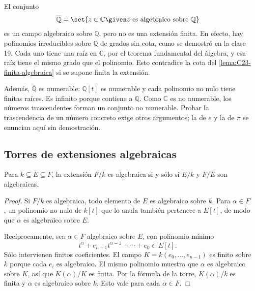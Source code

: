 \begin{ejem}
El conjunto
\[
\overline{\mathbb Q}=\set{z\in\mathbb C\given z\text{ es algebraico sobre }\mathbb Q}
\]
es un campo algebraico sobre $\mathbb Q$, pero no es una extensión finita. En efecto, hay polinomios irreducibles sobre $\mathbb Q$ de grados sin cota, como se demostró en la clase 19. Cada uno tiene una raíz en $\mathbb C$, por el teorema fundamental del álgebra, y esa raíz tiene el mismo grado que el polinomio. Esto contradice la cota del \cref{lema:C23-finita-algebraica} si se supone finita la extensión.

Además, $\overline{\mathbb Q}$ es numerable: $\mathbb Q[t]$ es numerable y cada polinomio no nulo tiene finitas raíces. Es infinito porque contiene a $\mathbb Q$. Como $\mathbb C$ es no numerable, los números trascendentes forman un conjunto no numerable. Probar la trascendencia de un número concreto exige otros argumentos; la de $e$ y la de $\pi$ se enuncian aquí sin demostración.
\end{ejem}

\subsection{Torres de extensiones algebraicas}
\begin{coro}\label{coro:C23-torre-algebraica}
Para $k\subseteq E\subseteq F$, la extensión $F/k$ es algebraica si y sólo si $E/k$ y $F/E$ son algebraicas.
\end{coro}
\begin{proof}
Si $F/k$ es algebraica, todo elemento de $E$ es algebraico sobre $k$. Para $\alpha\in F$, un polinomio no nulo de $k[t]$ que lo anula también pertenece a $E[t]$, de modo que $\alpha$ es algebraico sobre $E$.

Recíprocamente, sea $\alpha\in F$ algebraico sobre $E$, con polinomio mínimo
\[
t^n+e_{n-1}t^{n-1}+\cdots+e_0\in E[t].
\]
Sólo intervienen finitos coeficientes. El campo $K=k(e_0,\ldots,e_{n-1})$ es finito sobre $k$ porque cada $e_i$ es algebraico. El mismo polinomio muestra que $\alpha$ es algebraico sobre $K$, así que $K(\alpha)/K$ es finita. Por la fórmula de la torre, $K(\alpha)/k$ es finita y $\alpha$ es algebraico sobre $k$. Esto vale para cada $\alpha\in F$.
\end{proof}


